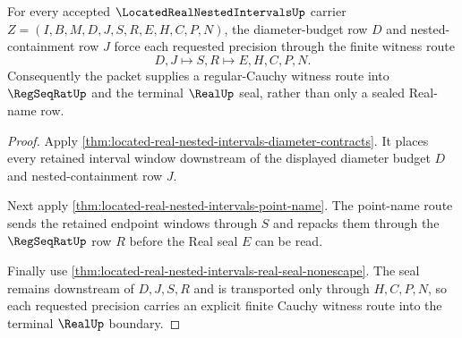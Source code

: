 \begin{theorem}
\label{thm:located-real-nested-intervals-cauchy-witness-route}
For every accepted $\LocatedRealNestedIntervalsUp$ carrier $Z=(I,B,M,D,J,S,R,E,H,C,P,N)$, the diameter-budget row $D$ and nested-containment row $J$ force each requested precision through the finite witness route
$$
D,J \longmapsto S,R \longmapsto E,H,C,P,N .
$$
Consequently the packet supplies a regular-Cauchy witness route into $\RegSeqRatUp$ and the terminal $\RealUp$ seal, rather than only a sealed Real-name row.
\end{theorem}
\begin{proof}
Apply \autoref{thm:located-real-nested-intervals-diameter-contracts}. It places every retained interval window downstream of the displayed diameter budget $D$ and nested-containment row $J$.

Next apply \autoref{thm:located-real-nested-intervals-point-name}. The point-name route sends the retained endpoint windows through $S$ and repacks them through the $\RegSeqRatUp$ row $R$ before the Real seal $E$ can be read.

Finally use \autoref{thm:located-real-nested-intervals-real-seal-nonescape}. The seal remains downstream of $D,J,S,R$ and is transported only through $H,C,P,N$, so each requested precision carries an explicit finite Cauchy witness route into the terminal $\RealUp$ boundary.
\end{proof}

